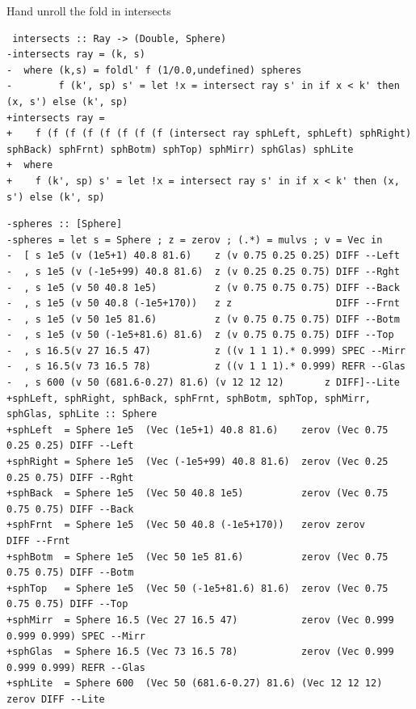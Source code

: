 \documentclass[8pt]{beamer}
\begin{document}
\begin{frame}[fragile]{Hand unroll the fold in intersects}

\begin{verbatim}
 intersects :: Ray -> (Double, Sphere)
-intersects ray = (k, s)
-  where (k,s) = foldl' f (1/0.0,undefined) spheres
-        f (k', sp) s' = let !x = intersect ray s' in if x < k' then (x, s') else (k', sp)
+intersects ray =
+    f (f (f (f (f (f (f (f (intersect ray sphLeft, sphLeft) sphRight) sphBack) sphFrnt) sphBotm) sphTop) sphMirr) sphGlas) sphLite
+  where
+    f (k', sp) s' = let !x = intersect ray s' in if x < k' then (x, s') else (k', sp)
\end{verbatim}

\begin{verbatim}
-spheres :: [Sphere]
-spheres = let s = Sphere ; z = zerov ; (.*) = mulvs ; v = Vec in
-  [ s 1e5 (v (1e5+1) 40.8 81.6)    z (v 0.75 0.25 0.25) DIFF --Left
-  , s 1e5 (v (-1e5+99) 40.8 81.6)  z (v 0.25 0.25 0.75) DIFF --Rght
-  , s 1e5 (v 50 40.8 1e5)          z (v 0.75 0.75 0.75) DIFF --Back
-  , s 1e5 (v 50 40.8 (-1e5+170))   z z                  DIFF --Frnt
-  , s 1e5 (v 50 1e5 81.6)          z (v 0.75 0.75 0.75) DIFF --Botm
-  , s 1e5 (v 50 (-1e5+81.6) 81.6)  z (v 0.75 0.75 0.75) DIFF --Top
-  , s 16.5(v 27 16.5 47)           z ((v 1 1 1).* 0.999) SPEC --Mirr
-  , s 16.5(v 73 16.5 78)           z ((v 1 1 1).* 0.999) REFR --Glas
-  , s 600 (v 50 (681.6-0.27) 81.6) (v 12 12 12)       z DIFF]--Lite
+sphLeft, sphRight, sphBack, sphFrnt, sphBotm, sphTop, sphMirr, sphGlas, sphLite :: Sphere
+sphLeft  = Sphere 1e5  (Vec (1e5+1) 40.8 81.6)    zerov (Vec 0.75 0.25 0.25) DIFF --Left
+sphRight = Sphere 1e5  (Vec (-1e5+99) 40.8 81.6)  zerov (Vec 0.25 0.25 0.75) DIFF --Rght
+sphBack  = Sphere 1e5  (Vec 50 40.8 1e5)          zerov (Vec 0.75 0.75 0.75) DIFF --Back
+sphFrnt  = Sphere 1e5  (Vec 50 40.8 (-1e5+170))   zerov zerov              DIFF --Frnt
+sphBotm  = Sphere 1e5  (Vec 50 1e5 81.6)          zerov (Vec 0.75 0.75 0.75) DIFF --Botm
+sphTop   = Sphere 1e5  (Vec 50 (-1e5+81.6) 81.6)  zerov (Vec 0.75 0.75 0.75) DIFF --Top
+sphMirr  = Sphere 16.5 (Vec 27 16.5 47)           zerov (Vec 0.999 0.999 0.999) SPEC --Mirr
+sphGlas  = Sphere 16.5 (Vec 73 16.5 78)           zerov (Vec 0.999 0.999 0.999) REFR --Glas
+sphLite  = Sphere 600  (Vec 50 (681.6-0.27) 81.6) (Vec 12 12 12)       zerov DIFF --Lite
\end{verbatim}

\end{frame}
\end{document}

